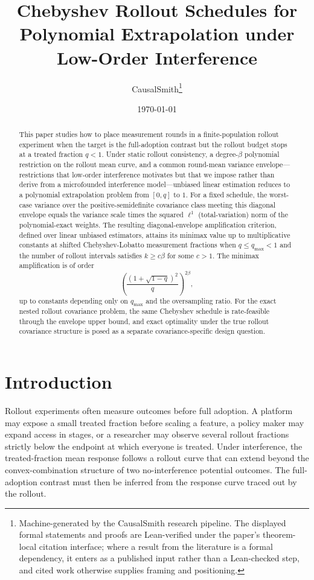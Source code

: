 \documentclass[11pt]{article}
\title{Chebyshev Rollout Schedules for Polynomial Extrapolation under Low-Order Interference}
\author{CausalSmith\thanks{Machine-generated by the CausalSmith research pipeline. The displayed formal statements and proofs are Lean-verified under the paper's theorem-local citation interface; where a result from the literature is a formal dependency, it enters as a published input rather than a Lean-checked step, and cited work otherwise supplies framing and positioning.}}
\date{\today}
\begin{document}
\maketitle

\begin{abstract}
This paper studies how to place measurement rounds in a finite-population rollout experiment when the target is the full-adoption contrast but the rollout budget stops at a treated fraction \(q<1\). Under static rollout consistency, a degree-\(\beta\) polynomial restriction on the rollout mean curve, and a common round-mean variance envelope---restrictions that low-order interference motivates but that we impose rather than derive from a microfounded interference model---unbiased linear estimation reduces to a polynomial extrapolation problem from \([0,q]\) to \(1\). For a fixed schedule, the worst-case variance over the positive-semidefinite covariance class meeting this diagonal envelope equals the variance scale times the squared \(\ell^1\) (total-variation) norm of the polynomial-exact weights. The resulting diagonal-envelope amplification criterion, defined over linear unbiased estimators, attains its minimax value up to multiplicative constants at shifted Chebyshev-Lobatto measurement fractions when \(q\le q_{\max}<1\) and the number of rollout intervals satisfies \(k\ge c\beta\) for some \(c>1\). The minimax amplification is of order
\[
\left(\frac{(1+\sqrt{1-q})^2}{q}\right)^{2\beta},
\]
up to constants depending only on \(q_{\max}\) and the oversampling ratio. For the exact nested rollout covariance problem, the same Chebyshev schedule is rate-feasible through the envelope upper bound, and exact optimality under the true rollout covariance structure is posed as a separate covariance-specific design question.
\end{abstract}

\section{Introduction}
Rollout experiments often measure outcomes before full adoption. A platform may expose a small treated fraction before scaling a feature, a policy maker may expand access in stages, or a researcher may observe several rollout fractions strictly below the endpoint at which everyone is treated. Under interference, the treated-fraction mean response follows a rollout curve that can extend beyond the convex-combination structure of two no-interference potential outcomes. The full-adoption contrast must then be inferred from the response curve traced out by the rollout.
\end{document}
